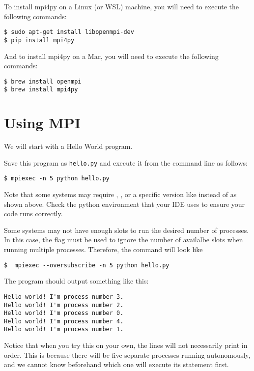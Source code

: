 \noindent To install mpi4py on a Linux (or WSL) machine, you will need to execute the following commands:
\begin{lstlisting}
$ sudo apt-get install libopenmpi-dev 
$ pip install mpi4py
\end{lstlisting}

\noindent And to install mpi4py on a Mac, you will need to execute the following commands:
\begin{lstlisting}
$ brew install openmpi
$ brew install mpi4py
\end{lstlisting}

\section*{Using MPI}
We will start with a Hello World program.

Save this program as \texttt{hello.py} and execute it from the command line as follows:
\begin{lstlisting}[style=ShellInput]
$ mpiexec -n 5 python hello.py
\end{lstlisting}

\begin{warn}
    Note that some systems may require , , or a specific version like  instead of  as shown above.
    Check the python environment that your IDE uses to ensure your code runs correctly.
\end{warn}

\begin{warn}
    Some systems may not have enough slots to run the desired number of processes.
    In this case, the  flag must be used to ignore the number of availalbe slots when running multiple processes.
    Therefore, the command will look like
    \begin{lstlisting}[style=ShellInput]
    $  mpiexec --oversubscribe -n 5 python hello.py
    \end{lstlisting}
\end{warn}

The program should output something like this:
\begin{lstlisting}[style=ShellOutput]
Hello world! I'm process number 3.
Hello world! I'm process number 2.
Hello world! I'm process number 0.
Hello world! I'm process number 4.
Hello world! I'm process number 1.
\end{lstlisting}
Notice that when you try this on your own, the lines will not necessarily print in order.
This is because there will be five separate processes running autonomously, and we cannot know beforehand which one will execute its  statement first.

